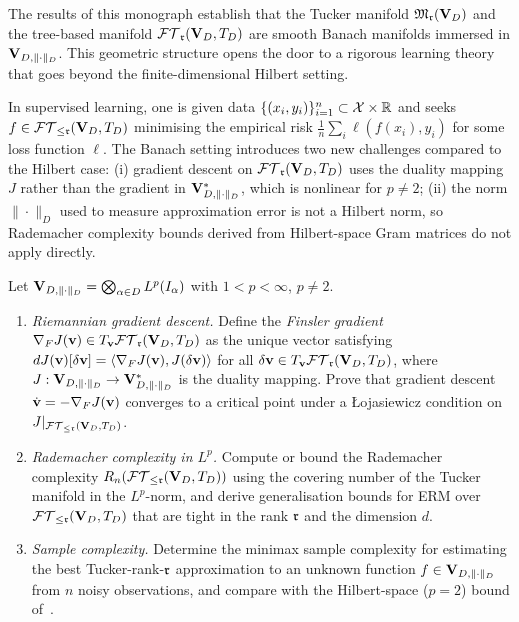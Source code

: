 The results of this monograph establish that the Tucker manifold
$\mathfrak{M}_{\mathfrak{r}}(\mathbf{V}_D)$ and the tree-based manifold $\mathcal{FT}_{\mathfrak{r}}(\mathbf{V}_D,T_D)$ are smooth Banach
manifolds immersed in $\mathbf{V}_{D,\|\cdot\|_D}$. This geometric structure opens the
door to a rigorous learning theory that goes beyond the finite-dimensional
Hilbert setting.

In supervised learning, one is given data $\{(x_i, y_i)\}_{i=1}^n
\subset \mathcal{X} \times \mathbb{R}$ and seeks $f \in \mathcal{FT}_{\leq \mathfrak{r}}(\mathbf{V}_D,T_D)$
minimising the empirical risk $\frac{1}{n}\sum_i \ell(f(x_i), y_i)$
for some loss function $\ell$. The Banach setting introduces two new
challenges compared to the Hilbert case:
(i) gradient descent on $\mathcal{FT}_{\mathfrak{r}}(\mathbf{V}_D,T_D)$ uses the duality mapping $J$ rather
than the gradient in $\mathbf{V}_{D,\|\cdot\|_D}^*$, which is nonlinear for $p \neq 2$;
(ii) the norm $\|\cdot\|_D$ used to measure approximation error is
not a Hilbert norm, so Rademacher complexity bounds derived from
Hilbert-space Gram matrices do not apply directly.

\begin{problem}
\label{prob:supervised_learning_banach}
Let $\mathbf{V}_{D,\|\cdot\|_D} = \bigotimes_{\alpha \in D} L^p(I_\alpha)$ with
$1 < p < \infty$, $p \neq 2$.
\begin{enumerate}
\item[\textup{(a)}] \emph{Riemannian gradient descent.}
    Define the \emph{Finsler gradient} $\nabla_F J(\mathbf{v}) \in
    T_{\mathbf{v}} \mathcal{FT}_{\mathfrak{r}}(\mathbf{V}_D,T_D)$ as the unique vector satisfying
    $dJ(\mathbf{v})[\delta\mathbf{v}] = \langle \nabla_F J(\mathbf{v}),
    J(\delta\mathbf{v})\rangle$ for all $\delta\mathbf{v} \in T_{\mathbf{v}}\mathcal{FT}_{\mathfrak{r}}(\mathbf{V}_D,T_D)$,
    where $J: \mathbf{V}_{D,\|\cdot\|_D} \to \mathbf{V}_{D,\|\cdot\|_D}^*$ is the duality mapping.
    Prove that gradient descent $\dot{\mathbf{v}} = -\nabla_F J(\mathbf{v})$
    converges to a critical point under a Łojasiewicz condition
    on $J|_{\mathcal{FT}_{\leq \mathfrak{r}}(\mathbf{V}_D,T_D)}$.
\item[\textup{(b)}] \emph{Rademacher complexity in $L^p$.}
    Compute or bound the Rademacher complexity $R_n(\mathcal{FT}_{\leq \mathfrak{r}}(\mathbf{V}_D,T_D))$
    using the covering number of the Tucker manifold in the
    $L^p$-norm, and derive generalisation bounds for ERM over
    $\mathcal{FT}_{\leq \mathfrak{r}}(\mathbf{V}_D,T_D)$ that are tight in the rank $\mathfrak{r}$ and
    the dimension $d$.
\item[\textup{(c)}] \emph{Sample complexity.}
    Determine the minimax sample complexity for estimating the best
    Tucker-rank-$\mathfrak{r}$ approximation to an unknown function
    $f \in \mathbf{V}_{D,\|\cdot\|_D}$ from $n$ noisy observations, and compare with
    the Hilbert-space ($p = 2$) bound of~\cite{Bachmayr2016}.
\end{enumerate}
\end{problem}

